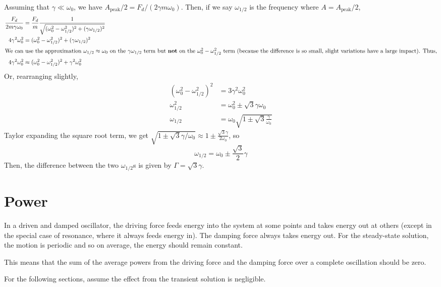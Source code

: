 Assuming that $\gamma \ll \omega_0$, we have $A_\text{peak}/2 = F_d/(2\gamma m\omega_0)$. Then, if we say $\omega_{1/2}$ is the frequency where $A=A_\text{peak}/2$, 
\begin{align*}
    \frac{F_d}{2m\gamma\omega_0} &= \frac{F_d}{m}\frac{1}{\sqrt{(\omega_0^2-\omega_{1/2}^2)^2+(\gamma\omega_{1/2})^2}} \\
    4\gamma^2\omega_0^2 &= (\omega_0^2-\omega_{1/2}^2)^2+(\gamma\omega_{1/2})^2 \\
    \intertext{We can use the approximation $\omega_{1/2} \approx \omega_0$ on the $\gamma\omega_{1/2}$ term but \textbf{not} on the $\omega_0^2-\omega_{1/2}^2$ term (because the difference is so small, slight variations have a large impact). Thus,}
    4\gamma^2\omega_0^2 &\approx  (\omega_0^2-\omega_{1/2}^2)^2 + \gamma^2\omega_0^2  
\end{align*}
Or, rearranging slightly,
\begin{align*}
    (\omega_0^2-\omega_{1/2}^2)^2 &= 3\gamma^2\omega_0^2 \\
    \omega_{1/2}^2 &= \omega_0^2\pm \sqrt{3}\gamma\omega_0 \\
    \omega_{1/2} &= \omega_0\sqrt{1 \pm \sqrt{3}\frac{\gamma}{\omega_0}}
\end{align*}
Taylor expanding the square root term, we get $\sqrt{1\pm\sqrt{3}\gamma/\omega_0} \approx 1\pm \frac{\sqrt 3\gamma}{2\omega_0}$, so
\[ \omega_{1/2} = \omega_0 \pm \frac{\sqrt{3}}{2}\gamma\]
Then, the difference between the two $\omega_{1/2}$s is given by $\Gamma = \sqrt{3}\gamma$.

\section{Power}
In a driven and damped oscillator, the driving force feeds energy into the system at some points and takes energy out at others (except in the special case of resonance, where it always feeds energy in). The damping force always takes energy out. For the steady-state solution, the motion is periodic and so on average, the energy should remain constant. 

This means that the sum of the average powers from the driving force and the damping force over a complete oscillation should be zero.

For the following sections, assume the effect from the transient solution is negligible.
